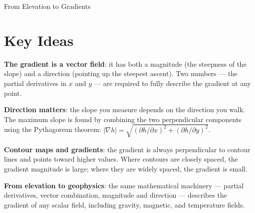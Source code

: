 \begin{activity}{From Elevation to Gradients}


\section*{Key Ideas}

\textbf{The gradient is a vector field}: it has both a magnitude (the steepness of the slope) and a direction (pointing up the steepest ascent). Two numbers --- the partial derivatives in $x$ and $y$ --- are required to fully describe the gradient at any point.

\textbf{Direction matters}: the slope you measure depends on the direction you walk. The maximum slope is found by combining the two perpendicular components using the Pythagorean theorem: $|\nabla h| = \sqrt{(\partial h/\partial x)^2 + (\partial h/\partial y)^2}$.

\textbf{Contour maps and gradients}: the gradient is always perpendicular to contour lines and points toward higher values. Where contours are closely spaced, the gradient magnitude is large; where they are widely spaced, the gradient is small.

\textbf{From elevation to geophysics}: the same mathematical machinery --- partial derivatives, vector combination, magnitude and direction --- describes the gradient of any scalar field, including gravity, magnetic, and temperature fields.

\end{activity}